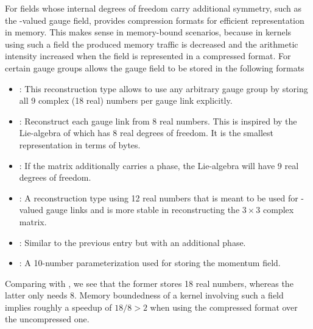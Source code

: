 For fields whose internal degrees of freedom carry additional symmetry, such as the -valued gauge field, \quda provides compression formats for efficient representation in memory.
This makes sense in memory-bound scenarios, because in kernels using such a field the produced memory traffic is decreased and the arithmetic intensity increased when the field is represented in a compressed format.
For certain gauge groups \quda allows the gauge field to be stored in the following formats
\begin{itemize}
  \item {}: This reconstruction type allows to use any arbitrary gauge group by storing all \num{9} complex (\num{18} real) numbers per gauge link explicitly.
  \item {}: Reconstruct each gauge link from \num{8} real numbers. This is inspired by the Lie-algebra of  which has \num{8} real degrees of freedom. It is the smallest representation in terms of bytes.
  \item {}: If the  matrix additionally carries a  phase, the Lie-algebra will have \num{9} real degrees of freedom.
  \item {}: A reconstruction type using \num{12} real numbers that is meant to be used for -valued gauge links and is more stable in reconstructing the $3 \times 3$ complex matrix.
  \item {}: Similar to the previous entry but with an additional  phase.
  \item {}: A \num{10}-number parameterization used for storing the momentum field.
\end{itemize}
Comparing  with , we see that the former stores \num{18} real numbers, whereas the latter only needs \num{8}. Memory boundedness of a kernel involving such a field implies roughly a speedup of $18/8 > 2$ when using the compressed format over the uncompressed one.


